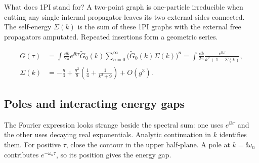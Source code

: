 What does 1PI stand for? A two-point graph is one-particle irreducible when cutting any single internal propagator leaves its two external sides connected. The self-energy $\Sigma(k)$ is the sum of these 1PI graphs with the external free propagators amputated. Repeated insertions form a geometric series.

\begin{align}
  G(\tau)
  &=\int\frac{\dd k}{2\pi}e^{\ii k\tau}\widetilde G_0(k)
  \sum_{n=0}^{\infty}\bigl(\widetilde G_0(k)\Sigma(k)\bigr)^n
  =\int\frac{\dd k}{2\pi}\frac{e^{\ii k\tau}}{k^2+1-\Sigma(k)},
  \label{eq:253a-ch02-self-energy-resummation}\\
  \Sigma(k)&=-\frac{g}{4}
  +\frac{g^2}{8}\left(\frac14+\frac1{k^2+9}\right)+O(g^3).
  \label{eq:253a-ch02-self-energy}
\end{align}

\subsection{Poles and interacting energy gaps}

The Fourier expression looks strange beside the spectral sum: one uses $e^{\ii k\tau}$ and the other uses decaying real exponentials. Analytic continuation in $k$ identifies them. For positive $\tau$, close the contour in the upper half-plane. A pole at $k=\ii\omega_n$ contributes $e^{-\omega_n\tau}$, so its position gives the energy gap.

